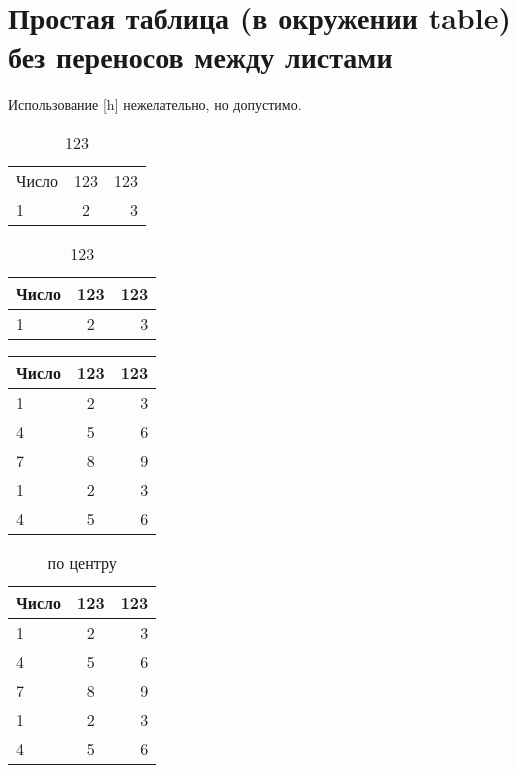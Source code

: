 \documentclass{article}
\begin{document}
\newpage

\section{Простая таблица (в окружении table) без переносов между листами}

Использование [h] нежелательно, но допустимо.

\begin{table}[h]
\caption{123}
\begin{tabular}{ l  c  r }
Число & 123 & 123 \\
  1 & 2 & 3 \\
\end{tabular}
\end{table}

\begin{table}[h]
\caption{123}
\begin{tabular}{ l  c  r }
 \hline		
Число & 123 & 123 \\
 \hline		
  1 & 2 & 3 \\
 \hline		
\end{tabular}
\end{table}

\begin{table}[h]
\begin{tabular}{ | l | c | r |}
 \hline		
Число & 123 & 123 \\ \hline		
  1 & 2 & 3 \\ \hline		
  4 & 5 & 6 \\ \hline		
  7 & 8 & 9 \\ \hline
  1 & 2 & 3 \\ \hline
  4 & 5 & 6 \\ \hline
\end{tabular}
\end{table}

\begin{table}[h]
\caption{по центру}
\centering
\begin{tabular}{ l | c | r }
 \hline		
Число & 123 & 123 \\
 \hline		
  1 & 2 & 3 \\
  4 & 5 & 6 \\
  7 & 8 & 9 \\
  1 & 2 & 3 \\
  4 & 5 & 6 \\
 \hline		
\end{tabular}
\end{table}
\end{document}
